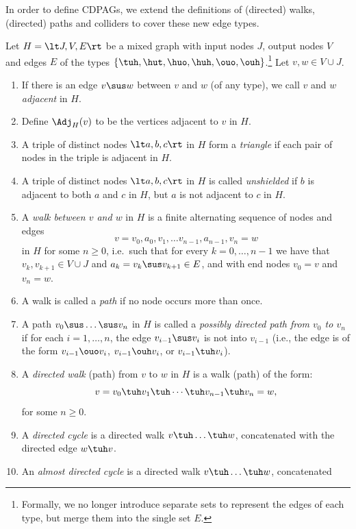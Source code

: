In order to define CDPAGs, we extend the definitions of (directed) walks, (directed) paths and colliders to cover these new edge types.
\begin{Def}\label{def:more_walks}
  Let $H=\lt J,V,E \rt$ be a mixed graph with input nodes $J$, output nodes $V$ and edges $E$ of the types $\{\tuh,\hut,\huo,\huh,\ouo,\ouh\}$.\footnote{Formally, we no longer introduce separate sets to represent the edges of each type, but merge them into the single set $E$.}
  Let $v,w \in V \cup J$.
  \begin{enumerate}
    \item If there is an edge $v \sus w$ between $v$ and $w$ (of any type), we call $v$ and $w$ \emph{adjacent} in $H$.
    \item Define $\Adj_H(v)$ to be the vertices adjacent to $v$ in $H$.
    \item A triple of distinct nodes $\lt a,b,c \rt$ in $H$ form a \emph{triangle} if each pair of nodes in the triple is adjacent in $H$.
    \item A triple of distinct nodes $\lt a,b,c \rt$ in $H$ is called \emph{unshielded} if $b$ is adjacent to both $a$ and $c$ in $H$, but $a$ is not adjacent to $c$ in $H$.
    \item A \emph{walk between $v$ and $w$} in $H$ is a finite alternating sequence of nodes and edges 
        \[v=v_0, a_0, v_1, \dots v_{n-1}, a_{n-1}, v_n=w\] 
        in $H$ for some $n \ge 0$, i.e.\ such that for every $k=0,\dots,n-1$ 
        we have that $v_{k},v_{k+1} \in V \cup J$ and $a_k = v_k \sus v_{k+1} \in E$, and with end nodes $v_0=v$ and $v_n=w$.
    \item A walk is called a \emph{path} if no node occurs more than once.
    \item A path $v_0 \sus \dots \sus v_n$ in $H$ is called a \emph{possibly directed path from $v_0$ to $v_n$} if for each $i=1,\dots,n$, the edge $v_{i-1} \sus v_i$ is not into $v_{i-1}$ (i.e., the edge is of the form $v_{i-1} \ouo v_i$, $v_{i-1} \ouh v_i$, or $v_{i-1} \tuh v_i$). 
    \item A \emph{directed walk} (path) from $v$ to $w$ in $H$ is a walk (path) of the form:
        \[v=v_0 \tuh v_1 \tuh  \cdots \tuh v_{n-1} \tuh v_n=w,\]
        for some $n \ge 0$.
    \item A \emph{directed cycle} is a directed walk $v \tuh \dots \tuh w$, concatenated with
      the directed edge $w \tuh v$.
    \item An \emph{almost directed cycle} is a directed walk $v \tuh \dots \tuh w$, concatenated

\end{enumerate}
\end{Def}
